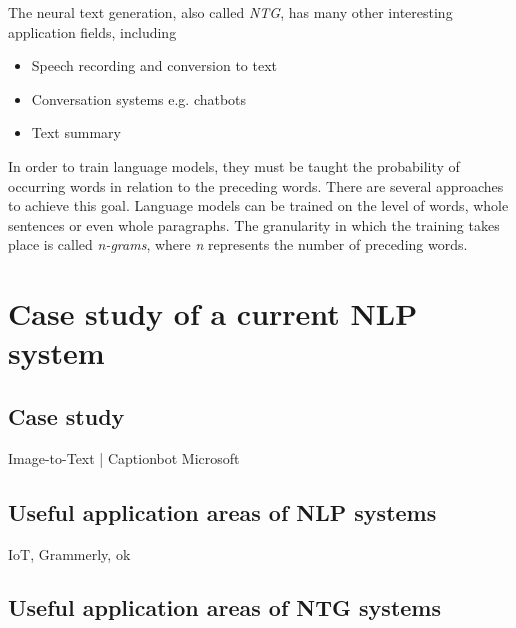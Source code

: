 The neural text generation, also called \textit{NTG}, has many other interesting application fields, including
\begin{itemize}
\item Speech recording and conversion to text
\item Conversation systems e.g. chatbots
\item Text summary
\end{itemize} 

In order to train language models, they must be taught the probability of occurring words in relation to the preceding words. There are several approaches to achieve this goal. Language models can be trained on the level of words, whole sentences or even whole paragraphs. The granularity in which the training takes place is called \textit{n-grams}, where \textit{n} represents the number of preceding words.

\section{Case study of a current NLP system}

\subsection{Case study}

Image-to-Text | Captionbot Microsoft

\subsection{Useful application areas of NLP systems}

IoT, Grammerly, ok

\subsection{Useful application areas of NTG systems}